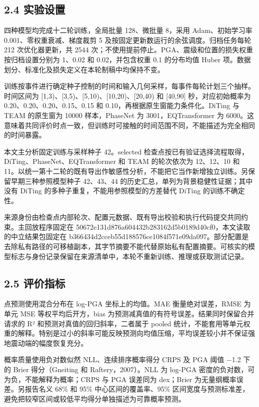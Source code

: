 \documentclass[UTF8,a4paper,11pt]{ctexart}
\begin{document}
\subsection*{2.4 实验设置}

四种模型均完成十二轮训练，全局批量 128、微批量 8，采用 Adam、初始学习率 0.001、零权重衰减、梯度裁剪 5 及按固定更新数运行的余弦调度。归档任务每轮 212 次优化器更新，共 2544 次；不使用提前停止。PGA、震级和位置的损失权重按归档设置分别为 1、0.02 和 0.02，并包含权重 0.1 的分布均值 Huber 项。数据划分、标准化及损失定义在本轮制稿中均保持不变。

训练按事件进行确定种子控制的时间和输入几何采样，每事件每轮计划三个抽样。时间区间为 [1,3)、[3,5)、[5,10)、[10,20)、[20,40) 和 [40,90] 秒，对应初始概率为 0.20、0.20、0.20、0.15、0.15 和 0.10，再根据原生窗能力条件化。DiTing 与 TEAM 的原生窗为 10000 样本，PhaseNet 为 3001，EQTransformer 为 6000。这意味着共同评价时点一致，但训练时可接触的时间范围不同，不能描述为完全相同的时间暴露。

本文主分析固定训练与采样种子 42。selected 检查点按已有验证选择流程取得，DiTing、PhaseNet、EQTransformer 和 TEAM 的轮次依次为 12、12、10 和 11。以统一第十二轮的既有导出作敏感性分析，不能把它当作新增独立训练。另保留早期三种参照模型种子 42、43、44 的历史汇总，单列为背景稳健性证据；其中没有 DiTing 的多种子重复，不能用参照模型的方差替代 DiTing 的训练不确定性。

来源身份由检查点内部轮次、配置元数据、既有导出校验和执行代码提交共同约束。主回放程序固定在 50672e131d876a604432b283162d5b0189d40cf0，本文读取的中立结果包固定在 b366434d2cceb55d188576ce1084f571e09da097。部分配置是去除私有路径的可移植副本，其字节摘要不能代替原始私有配置摘要。可核实的模型标志与身份记录保留在来源清单中，本轮不重新训练、推理或获取测试记录。

\subsection*{2.5 评价指标}

点预测使用混合分布在 log-PGA 坐标上的均值。MAE 衡量绝对误差，RMSE 为单元 MSE 等权平均后开方，bias 为预测减真值的有符号误差。结果同时保留合并请求的 R² 和预测对真值的回归斜率，二者属于 pooled 统计，不能套用等单元权重的解释。特别是过小的斜率可能反映预测向均值压缩，平均误差较小并不保证强地震动端的幅度恢复充分。

概率质量使用负对数似然 NLL、连续排序概率得分 CRPS 及 PGA 阈值 −1.2 下的 Brier 得分（Gneiting 和 Raftery，2007）。NLL 为 log-PGA 密度的负对数，可为负，不能解释为概率；CRPS 与 PGA 误差同为 dex；Brier 为无量纲概率误差。另报告名义 68\% 和 95\% 中心区间的覆盖率、95\% 区间宽度与预测标准差，避免把较窄区间或较低平均得分单独描述为可靠概率预测。
\end{document}
